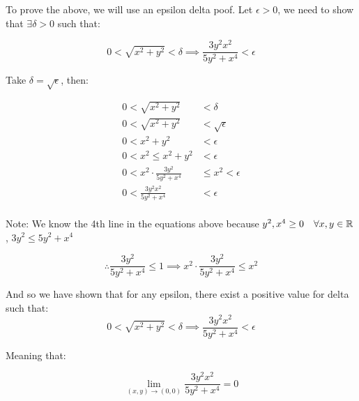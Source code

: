 \documentclass[12pt]{article} %
\begin{document}
\begin{homeworkProblem}

    To prove the above, we will use an epsilon delta poof. Let $\epsilon > 0$, we need to show that $\exists \delta > 0$ such that:

    \begin{equation*}
        0 < \sqrt{x^2 + y^2} < \delta \implies \frac{3 y^2 x^2}{5 y^2 + x^4} < \epsilon
    \end{equation*}

    Take $\delta = \sqrt{\epsilon}$, then:

    \begin{align*}
        0 < \sqrt{x^2 + y^2}                    & < \delta            \\
        0 < \sqrt{x^2 + y^2}                    & < \sqrt{\epsilon}   \\
        0 < x^2 + y^2                           & < \epsilon          \\
        0 < x^2 \leq x^2 + y^2                  & < \epsilon          \\
        0 < x^2 \cdot \frac{3 y^2}{5 y^2 + x^4} & \leq x^2 < \epsilon \\
        0 < \frac{3 y^2 x^2}{5 y^2 + x^4}       & < \epsilon          \\
    \end{align*}

    Note: We know the 4th line in the equations above because $y^2, x^4 \geq 0 \quad \forall x, y \in \mathbb{R}$, $3y^2 \leq 5y^2 + x^4$

    $$
        \therefore \frac{3y^2}{5y^2 + x^4} \leq 1 \implies x^2 \cdot \frac{3 y^2}{5 y^2 + x^4} \leq x^2
    $$

    And so we have shown that for any epsilon, there exist a positive value for delta such that:
    \begin{equation*}
        0 < \sqrt{x^2 + y^2} < \delta \implies \frac{3 y^2 x^2}{5 y^2 + x^4} < \epsilon
    \end{equation*}

    Meaning that:

    $$
        \lim_{(x, y) \to (0, 0)} \frac{3 y^2 x^2}{5 y^2 + x^4} = 0
    $$
\end{homeworkProblem}
\end{document}
